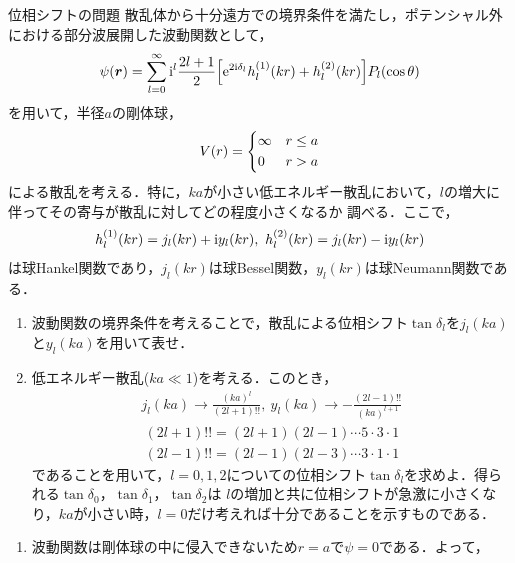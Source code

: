 \documentclass{report}
\begin{document}
  \begin{myex}{位相シフトの問題}{}
    散乱体から十分遠方での境界条件を満たし，ポテンシャル外における部分波展開した波動関数として，
    \begin{align}
      \psi(\bm{r}) = \sum_{l=0}^{\infty} \mathrm{i}^l \frac{2l+1}{2}\qty[\mathrm{e}^{2\mathrm{i}\delta_l} h_l^{(1)} (kr) + h_l^{(2)} (kr)] P_l(\cos\theta)
    \end{align}
    を用いて，半径$a$の剛体球，
    \begin{align}
      V(r) = 
      \begin{dcases}
        \infty & r\leq a \\
        0 & r > a 
      \end{dcases}
    \end{align}
    による散乱を考える．特に，$ka$が小さい低エネルギー散乱において，$l$の増大に伴ってその寄与が散乱に対してどの程度小さくなるか
    調べる．ここで，
    \begin{align}
      h_l^{(1)}(kr) = j_l(kr) + \mathrm{i} y_l(kr),\ h_l^{(2)}(kr) = j_l(kr) - \mathrm{i} y_l(kr)
    \end{align}
    は球Hankel関数であり，$j_l(kr)$は球Bessel関数，$y_l(kr)$は球Neumann関数である．
    \begin{enumerate}
      \item 波動関数の境界条件を考えることで，散乱による位相シフト$\tan\delta_l$を$j_l(ka)$と$y_l(ka)$を用いて表せ．
      \item 低エネルギー散乱($ka \ll 1$)を考える．このとき，
        \begin{align}
          j_l(ka) \to \frac{(ka)^l}{(2l+1)!!},\ y_l(ka) \to -\frac{(2l-1)!!}{(ka)^{l+1}}\label{LimitOfBessel}
        \end{align}
        \begin{align}
          (2l+1)!! = (2l+1)(2l-1)\cdots5\cdot3\cdot1 \\
          (2l-1)!! = (2l-1)(2l-3)\cdots3\cdot1\cdot1
        \end{align}
        であることを用いて，$l = 0, 1, 2$についての位相シフト$\tan\delta_l$を求めよ．得られる$\tan\delta_0$，$\tan\delta_1$，$\tan\delta_2$は
        $l$の増加と共に位相シフトが急激に小さくなり，$ka$が小さい時，$l = 0$だけ考えれば十分であることを示すものである．
    \end{enumerate}
    \tcblower
    \begin{enumerate}
      \item 波動関数は剛体球の中に侵入できないため$r=a$で$\psi=0$である．よって，
        \begin{align}

\end{align}
\end{enumerate}
\end{myex}
\end{document}

